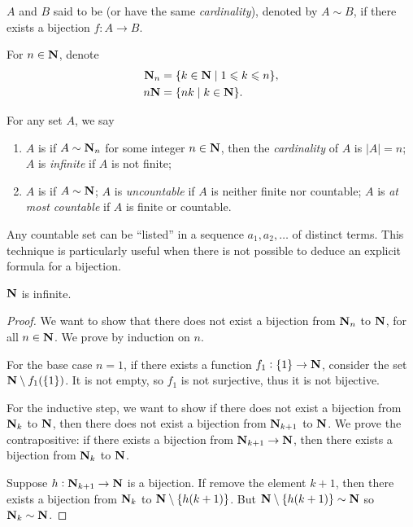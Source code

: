 \begin{definition}
$A$ and $B$ said to be  (or have the same \emph{cardinality}), denoted by $A\sim B$, if there exists a bijection $f:A\to B$. 
\end{definition}

\begin{notation}
For $n\in\mathbf N$, denote
\begin{align*}
\mathbf N_n&=\{k\in\mathbf N\mid 1\leqslant k\leqslant n\},\\
n\mathbf N&=\{nk\mid k\in\mathbf N\}.
\end{align*}
\end{notation}

\begin{definition}
For any set $A$, we say
\begin{enumerate}[label=(\roman*)]
\item $A$ is  if $A\sim\mathbf N_n$ for some integer $n\in\mathbf N$, then the \emph{cardinality} of $A$ is $|A|=n$; $A$ is \emph{infinite} if $A$ is not finite;
\item $A$ is  if $A\sim \mathbf N$; $A$ is \emph{uncountable} if $A$ is neither finite nor countable; $A$ is \emph{at most countable} if $A$ is finite or countable.
\end{enumerate}
\end{definition}

\begin{remark}
Any countable set can be ``listed'' in a sequence $a_1,a_2,\dots$ of distinct terms. This technique is particularly useful when there is not possible to deduce an explicit formula for a bijection.
\end{remark}

\begin{proposition}
$\mathbf N$ is infinite.
\end{proposition}

\begin{proof}
We want to show that there does not exist a bijection from $\mathbf N_n$ to $\mathbf N$, for all $n\in\mathbf N$. We prove by induction on $n$.

For the base case $n=1$, if there exists a function $f_1:\{1\}\to\mathbf N$, consider the set $\mathbf N\setminus f_1(\{1\})$. It is not empty, so $f_1$ is not surjective, thus it is not bijective.

For the inductive step, we want to show if there does not exist a bijection from $\mathbf N_k$ to $\mathbf N$, then there does not exist a bijection from $\mathbf N_{k+1}$ to $\mathbf N$. We prove the contrapositive: if there exists a bijection from $\mathbf N_{k+1}\to\mathbf N$, then there exists a bijection from $\mathbf N_k$ to $\mathbf N$.

Suppose $h:\mathbf N_{k+1}\to\mathbf N$ is a bijection. If remove the element $k+1$, then there exists a bijection from $\mathbf N_k$ to $\mathbf N\setminus\{h(k+1)\}$. But $\mathbf N\setminus\{h(k+1)\}\sim\mathbf N$ so $\mathbf N_k\sim\mathbf N$.
\end{proof}

